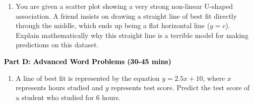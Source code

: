 \documentclass[12pt, letterpaper, fleqn]{article}
\newcommand{\blank}{\underline{\hspace{2.2cm}}}
\begin{document}
\vspace{3mm}

\begin{enumerate}[itemsep=5.5cm, leftmargin=0.6cm, resume]
\item You are given a scatter plot showing a very strong non-linear U-shaped association. A friend insists on drawing a straight line of best fit directly through the middle, which ends up being a flat horizontal line ($y=c$). Explain mathematically why this straight line is a terrible model for making predictions on this dataset.
\end{enumerate}

\newpage

\begin{tcolorbox}[colback=customteal!20]
\large\textcolor{black}{\textbf{Part D: Advanced Word Problems (30-45 mins)}}
\end{tcolorbox}

\vspace{3mm}

\begin{enumerate}[itemsep=5.5cm, leftmargin=0.6cm, resume]
\item A line of best fit is represented by the equation $y = 2.5x + 10$, where $x$ represents hours studied and $y$ represents test score. Predict the test score of a student who studied for 6 hours. \blank
\end{enumerate}
\end{document}
